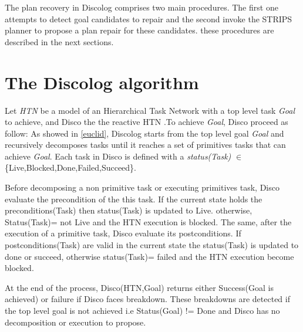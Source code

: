 The plan recovery in Discolog comprises two main procedures. The first one attempts to detect goal candidates to repair and the second invoke the STRIPS planner to propose a plan repair for these candidates. these procedures are described in the next sections.
\section{The Discolog algorithm}
Let \textit{HTN} be a model of an Hierarchical Task Network with a top level task \textit{Goal} to achieve, and Disco the the reactive HTN .To achieve \textit{Goal},  Disco  proceed as follow:
As showed in \ref{euclid}, Discolog starts from the top level goal \textit{Goal} and recursively decomposes tasks until it reaches a set of primitives tasks that can achieve \textit{Goal}.
Each task in Disco is defined with a \textit{status(Task)} $\in$ \{Live,Blocked,Done,Failed,Succeed\}.
\par Before decomposing a non primitive task or executing primitives task, Disco evaluate the precondition of the this task. If the current state holds the preconditions(Task) then status(Task) is updated to Live. otherwise, Status(Task)= not Live and the HTN execution is blocked.
The same, after the execution of a primitive task, Disco evaluate its postconditions. If postconditions(Task) are valid in the current state the status(Task) is updated to done or succeed, otherwise status(Task)= failed and the HTN execution become blocked.


At the end of the process, Disco(HTN,Goal) returns either Success(Goal is achieved) or failure if Disco faces breakdown. These breakdowns are detected if the top level goal is not achieved i.e Status(Goal) != Done and Disco has no decomposition or execution to propose. 

